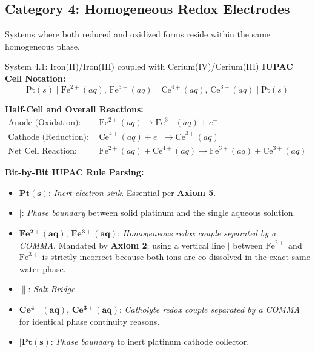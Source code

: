 \documentclass[10pt,a4paper]{article}
\begin{document}
\subsection{Category 4: Homogeneous Redox Electrodes}
Systems where both reduced and oxidized forms reside within the same homogeneous phase.

\begin{examplebox}{System 4.1: Iron(II)/Iron(III) coupled with Cerium(IV)/Cerium(III)}
\textbf{IUPAC Cell Notation:}
\begin{equation*}
    \text{Pt}(s) \mid \text{Fe}^{2+}(aq),\, \text{Fe}^{3+}(aq) \parallel \text{Ce}^{4+}(aq),\, \text{Ce}^{3+}(aq) \mid \text{Pt}(s)
\end{equation*}

\textbf{Half-Cell and Overall Reactions:}
\begin{align*}
    \text{Anode (Oxidation):} \quad & \text{Fe}^{2+}(aq) \longrightarrow \text{Fe}^{3+}(aq) + e^- \\
    \text{Cathode (Reduction):} \quad & \text{Ce}^{4+}(aq) + e^- \longrightarrow \text{Ce}^{3+}(aq) \\
    \text{Net Cell Reaction:} \quad & \text{Fe}^{2+}(aq) + \text{Ce}^{4+}(aq) \longrightarrow \text{Fe}^{3+}(aq) + \text{Ce}^{3+}(aq)
\end{align*}

\textbf{Bit-by-Bit IUPAC Rule Parsing:}
\begin{itemize}[leftmargin=*]
    \item $\mathbf{Pt(s)}$: \textit{Inert electron sink}. Essential per \textbf{Axiom 5}.
    \item $\mathbf{\mid}$: \textit{Phase boundary} between solid platinum and the single aqueous solution.
    \item $\mathbf{Fe^{2+}(aq),\, Fe^{3+}(aq)}$: \textit{Homogeneous redox couple separated by a COMMA}. Mandated by \textbf{Axiom 2}; using a vertical line $\mid$ between $\text{Fe}^{2+}$ and $\text{Fe}^{3+}$ is strictly incorrect because both ions are co-dissolved in the exact same water phase.
    \item $\mathbf{\parallel}$: \textit{Salt Bridge}.
    \item $\mathbf{Ce^{4+}(aq),\, Ce^{3+}(aq)}$: \textit{Catholyte redox couple separated by a COMMA} for identical phase continuity reasons.
    \item $\mathbf{\mid Pt(s)}$: \textit{Phase boundary} to inert platinum cathode collector.
\end{itemize}
\end{examplebox}
\end{document}
